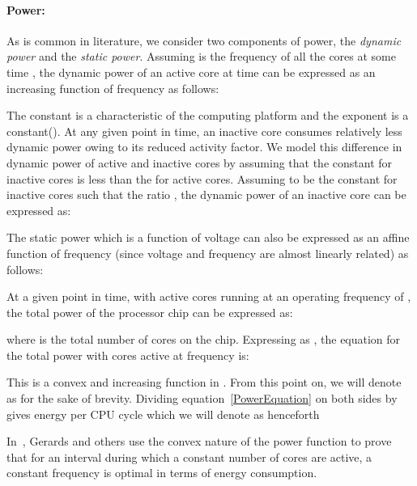 \documentclass[11pt, letterpaper]{article}
\begin{document}
\paragraph{Power:}
As is common in literature, we consider two components of power, the \emph{dynamic power} and the \emph{static power}. Assuming  is the frequency of all the cores at some time , the dynamic power of an active core at time  can be expressed as an increasing function of frequency as follows:

The constant  is a characteristic of the computing platform and the exponent  is a constant().
At any given point in time, an inactive core consumes relatively less dynamic power owing to its reduced activity factor. We model this difference in dynamic power of active and inactive cores by assuming that the constant  for inactive cores is less than the  for active cores.
Assuming  to be the constant for inactive cores such that the ratio , the dynamic power of an inactive core can be expressed as:

The static power which is a function of voltage can also be expressed as an affine function of frequency (since voltage and frequency are almost linearly related) as follows:

At a given point in time, with  active cores running at an operating frequency of , the total power of the processor chip can be expressed as:

where  is the total number of cores on the chip.
Expressing  as , the equation for the total power with  cores active at frequency  is:

This is a convex and increasing function in . From this point on, we will denote  as  for the sake of brevity. 
Dividing equation~\ref{PowerEquation} on both sides by  gives energy per CPU cycle which we will denote as   henceforth



In~\cite{ConvexAndScheduling}, Gerards and others use the convex nature of the power function to prove that for an interval during which a constant number of cores are active, a constant frequency is optimal in terms of energy consumption. 
\end{document}
